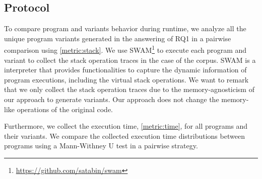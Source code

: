 
\subsection*{Protocol}

To compare program and variants behavior during runtime, we analyze all the unique program variants generated in the answering of RQ1 in a pairwise comparison using \autoref{metric:stack}. We use SWAM\footnote{\url{https://github.com/satabin/swam}} to execute each program and variant to collect the stack operation traces in the case of the \corpusrosetta corpus. SWAM is a \wasm interpreter that provides functionalities to capture the dynamic information of \wasm program executions, including the virtual stack operations. We want to remark that we only collect the stack operation traces due to the memory-agnosticism of our approach to generate variants. Our approach does not change the memory-like operations of the original code.

Furthermore, we collect the execution time, \autoref{metric:time}, for all programs and their variants. We compare the collected execution time distributions between programs using a Mann-Withney U test \cite{mann1947} in a pairwise strategy.


 